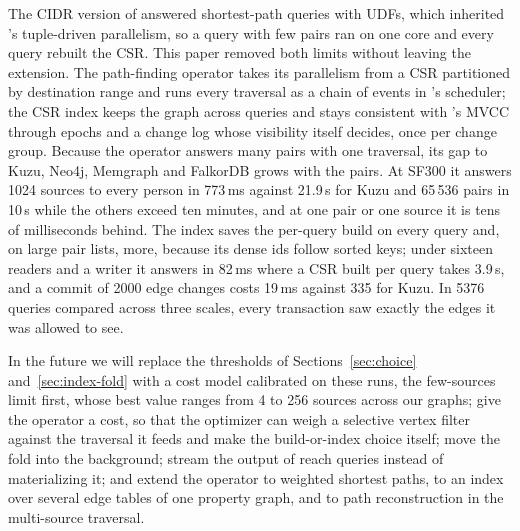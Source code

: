 The CIDR version of \duckpgq answered shortest-path queries with UDFs, which inherited \duckdb's tuple-driven
parallelism, so a query with few pairs ran on one core and every query rebuilt the CSR. This paper removed both limits
without leaving the extension. The path-finding operator takes its parallelism from a CSR partitioned by destination
range and runs every traversal as a chain of events in \duckdb's scheduler; the CSR index keeps the graph across
queries and stays consistent with \duckdb's MVCC through epochs and a change log whose visibility \duckdb itself
decides, once per change group. Because the operator answers many pairs with one traversal, its gap to Kuzu, Neo4j,
Memgraph and FalkorDB grows with the pairs. At SF300 it answers 1024 sources to every person in 773\,ms against
21.9\,s for Kuzu and 65\,536 pairs in 10\,s while the others exceed ten minutes, and at one pair or one source it is
tens of milliseconds behind. The index saves the per-query build on every query and, on large pair lists, more,
because its dense ids follow sorted keys; under sixteen readers and a writer it answers in 82\,ms where a CSR built
per query takes 3.9\,s, and a commit of 2000 edge changes costs 19\,ms against 335 for Kuzu. In 5376 queries compared
across three scales, every transaction saw exactly the edges it was allowed to see.

In the future we will replace the thresholds of Sections~\ref{sec:choice} and~\ref{sec:index-fold} with a cost
model calibrated on these runs, the few-sources limit first, whose best value ranges from 4 to 256 sources across our
graphs; give the operator a cost, so that the optimizer can weigh a selective vertex filter against the traversal it feeds and make the build-or-index choice itself; move the fold into the background; stream the output of reach queries instead of materializing it; and extend
the operator to weighted shortest paths, to an index over several edge tables of one property graph, and to path
reconstruction in the multi-source traversal.
